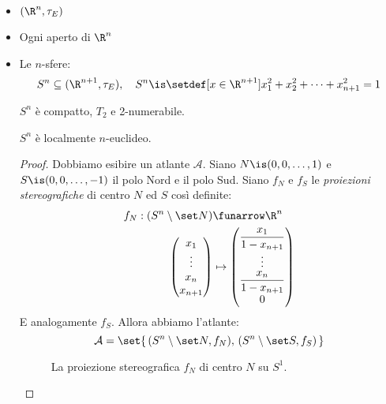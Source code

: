 \begin{itemize}
	\item $(\R^n, \tau_E)$
	\item Ogni aperto di $\R^n$
	\item Le $n$-sfere:
		\[S^n \subseteq (\R^{n+1}, \tau _E), \quad
		S^n\is\setdef[x\in \R^{n+1}]{x_1^2 + x_2^2 + \dots + x_{n+1}^2 = 1}\]
		
		\begin{oss}
			$S^n$ è compatto, $T_2$ e 2-numerabile.
		\end{oss}
		
		\begin{prop}
			$S^n$ è localmente $n$-euclideo.
		\end{prop}
		
		\vspace{-2.5ex}
		\begin{proof}
			Dobbiamo esibire un atlante $\mathcal{A}$.
			Siano $N\is(0,0,\dots,1)$ e $S\is(0,0,\dots,-1)$ il polo Nord e il polo Sud.
			Siano $f_N$ e $f_S$ le \emph{proiezioni stereografiche} di centro $N$ ed $S$ così definite:
			\begin{align*}
				f_N:(S^n \setminus \set N) &\funarrow \R^n \\
				\begin{pmatrix}
					x_1\\
					\vdots\\
					x_n\\
					x_{n+1}
				\end{pmatrix} &\mapsto
				\begin{pmatrix}
					\dfrac{x_1}{1-x_{n+1}}\\
					\vdots\\
					\dfrac{x_n}{1-x_{n+1}}\\
					0
				\end{pmatrix}
			\end{align*}
			E analogamente $f_S$. Allora abbiamo l'atlante:
			\[\mathcal{A} = \set{\, (S^n \setminus \set N, f_N),\, (S^n \setminus \set S, f_S)\,} \qedhere\]
			\begin{figure}
				\centering
				
				\caption{La proiezione stereografica $f_N$ di centro $N$ su $S^1$.}
			\end{figure}
		\end{proof}
\end{itemize}
